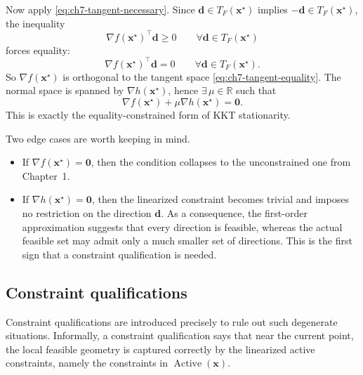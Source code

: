 Now apply \eqref{eq:ch7-tangent-necessary}. Since
$\mathbf{d}\in T_F(\mathbf{x}^\star)$ implies $-\mathbf{d}\in T_F(\mathbf{x}^\star)$,
the inequality
\[
  \nabla f(\mathbf{x}^\star)^\top \mathbf{d}\ge 0
  \qquad \forall \mathbf{d}\in T_F(\mathbf{x}^\star)
\]
forces equality:
\[
  \nabla f(\mathbf{x}^\star)^\top \mathbf{d}=0
  \qquad \forall \mathbf{d}\in T_F(\mathbf{x}^\star).
\]
So $\nabla f(\mathbf{x}^\star)$ is orthogonal to the tangent space
\eqref{eq:ch7-tangent-equality}. The normal space is
spanned by $\nabla h(\mathbf{x}^\star)$, hence $\exists\, \mu\in\mathbb{R}$ such
that
\[
  \nabla f(\mathbf{x}^\star) + \mu \nabla h(\mathbf{x}^\star)=\mathbf{0}.
\]
This is exactly the equality-constrained form of KKT stationarity.

Two edge cases are worth keeping in mind.
\begin{itemize}
  \item If $\nabla f(\mathbf{x}^\star)=\mathbf{0}$, then the condition collapses to
  the unconstrained one from Chapter~1.
  \item If $\nabla h(\mathbf{x}^\star)=\mathbf{0}$, then the linearized
  constraint becomes trivial and imposes no restriction on the direction
  $\mathbf{d}$. As a consequence, the first-order approximation suggests that
  every direction is feasible, whereas the actual feasible set may admit only a
  much smaller set of directions. This is the first sign that a constraint
  qualification is needed.
\end{itemize}

\subsection{Constraint qualifications}
\label{sec:ch7-cq}
Constraint qualifications are introduced precisely to rule out such
degenerate situations. Informally, a constraint qualification says that near
the current point, the local feasible geometry is captured correctly by the
linearized active constraints, namely the constraints in
$\operatorname{Active}(\mathbf{x})$.

